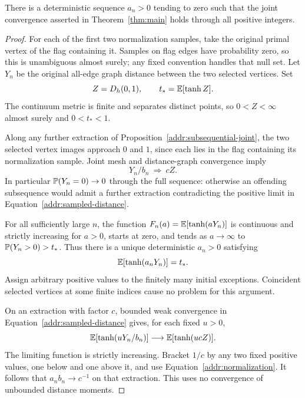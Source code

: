 \begin{lemma}\label{addr:calibration}
There is a deterministic sequence $a_n>0$ tending to zero
such that the joint convergence asserted in
Theorem~\ref{thm:main} holds through all positive integers.
\end{lemma}

\begin{proof}
For each of the first two normalization samples, take the
original primal vertex of the flag containing it.  Samples
on flag edges have probability zero, so this is unambiguous
almost surely; any fixed convention handles that null set.
Let $Y_n$ be the original all-edge graph distance between
the two selected vertices.  Set
\[
                   Z=D_h(0,1),\qquad t_*=\mathbb E[\tanh Z].
\]
The continuum metric is finite and separates distinct
points, so $0<Z<\infty$ almost surely and $0<t_*<1$.

Along any further extraction of
Proposition~\ref{addr:subsequential-joint}, the two selected
vertex images approach $0$ and $1$, since each lies in
the flag containing its normalization sample.  Joint mesh
and distance-graph convergence imply
\begin{equation}\label{addr:sampled-distance}
                         Y_n/b_n\ \Longrightarrow\ cZ.
\end{equation}
In particular $\mathbb P(Y_n=0)\to0$ through the full sequence:
otherwise an offending subsequence would admit a further
extraction contradicting the positive limit in
Equation~\eqref{addr:sampled-distance}.

For all sufficiently large $n$, the function
$F_n(a)=\mathbb E[\tanh(aY_n)]$ is continuous and strictly increasing
for $a>0$, starts at zero, and tends as $a\to\infty$ to
$\mathbb P(Y_n>0)>t_*$.  Thus there is a unique deterministic
$a_n>0$ satisfying
\begin{equation}\label{addr:normalization}
                         \mathbb E[\tanh(a_nY_n)]=t_*.
\end{equation}
Assign arbitrary positive values to the finitely many initial
exceptions.  Coincident selected vertices at some finite
indices cause no problem for this argument.

On an extraction with factor $c$, bounded weak convergence
in Equation~\eqref{addr:sampled-distance} gives, for each
fixed $u>0$,
\[
           \mathbb E[\tanh(uY_n/b_n)]\longrightarrow\mathbb E[\tanh(ucZ)].
\]
The limiting function is strictly increasing.  Bracket
$1/c$ by any two fixed positive values, one below and one
above it, and use Equation~\eqref{addr:normalization}.
It follows that $a_nb_n\to c^{-1}$ on that extraction.
This uses no convergence of unbounded distance moments.


\end{proof}
